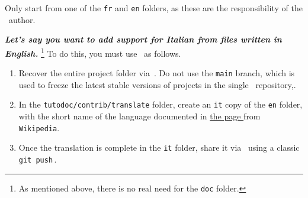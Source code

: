 \documentclass{tutodoc}
\begin{document}
\begin{tdocwarn}
    Only start from one of the \verb#fr# and \verb#en# folders, as these are the responsibility of the \thisproj\ author.
\end{tdocwarn}


\medskip


\emph{\textbf{Let's say you want to add support for Italian from files written in English.}}%
\footnote{
    As mentioned above, there is no real need for the \texttt{doc} folder.
}
To do this, you must use \git\ as follows.
%
\begin{enumerate}
      \item Recover the entire project folder via \thisrepo\,.
    Do not use the \verb#main# branch, which is used to freeze the latest stable versions of projects in the single \thismonorepo\ repository,.

      \item In the \verb#tutodoc/contrib/translate# folder, create an \verb#it# copy of the \verb#en# folder, with the short name of the language documented in
      \href{https://en.wikipedia.org/wiki/IETF_language_tag#List_of_common_primary_language_subtags}%
           {the page }
      from \texttt{Wikipedia}.

      \item Once the translation is complete in the \verb#it# folder, share it via \thisrepo\ using a classic \verb#git push#\,.
\end{enumerate}
\end{document}
